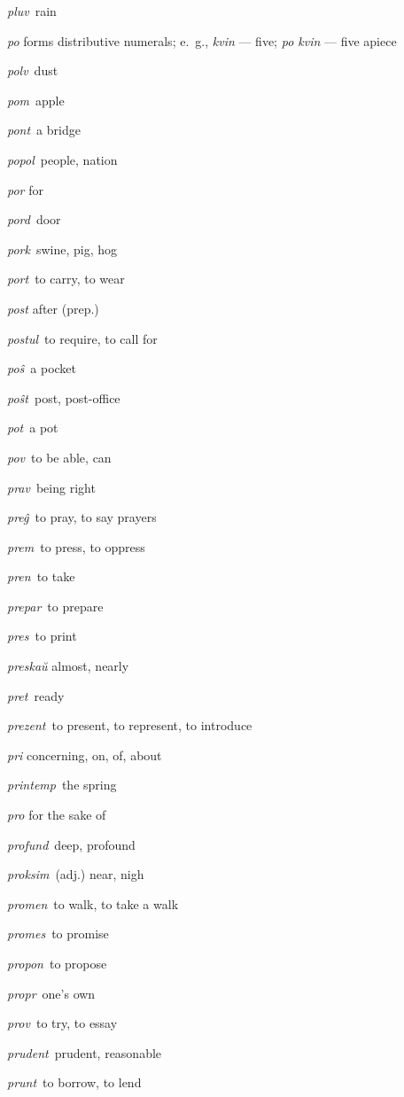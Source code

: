 \begin{landscape}
\begin{multicols}{5}
\begin{outdent}{1em}
\emph{pluv\,} rain

\emph{po} forms distributive numerals; e.~g., \emph{kvin} — five; \emph{po kvin} — five apiece

\emph{polv\,} dust

\emph{pom\,} apple

\emph{pont\,} a bridge

\emph{popol\,} people, nation

\emph{por} for

\emph{pord\,} door

\emph{pork\,} swine, pig, hog

\emph{port\,} to carry, to wear

\emph{post} after (prep.)

\emph{postul\,} to require, to call for

\emph{poŝ\,} a pocket

\emph{poŝt\,} post, post-office

\emph{pot\,} a pot

\emph{pov\,} to be able, can

\emph{prav\,} being right

\emph{preĝ\,} to pray, to say prayers

\emph{prem\,} to press, to oppress

\emph{pren\,} to take

\emph{prepar\,} to prepare

\emph{pres\,} to print

\emph{preskaŭ} almost, nearly

\emph{pret\,} ready

\emph{prezent\,} to present, to represent, to introduce

\emph{pri} concerning, on, of, about

\emph{printemp\,} the spring

\emph{pro} for the sake of 

\emph{profund\,} deep, profound

\emph{proksim\,} (adj.) near, nigh

\emph{promen\,} to walk, to take a walk

\emph{promes\,} to promise

\emph{propon\,} to propose

\emph{propr\,} one’s own

\emph{prov\,} to try, to essay

\emph{prudent\,} prudent, reasonable

\emph{prunt\,} to borrow, to lend


\end{outdent}
\end{multicols}
\end{landscape}

